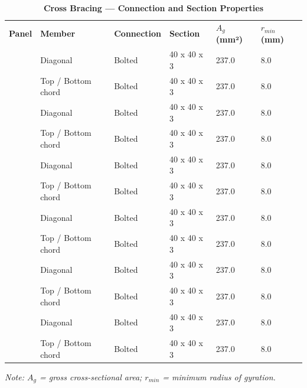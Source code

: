 \documentclass[12pt,a4paper]{report}
\numberwithin{table}{chapter}
\numberwithin{figure}{chapter}
\begin{document}
\vspace{1em}

\vspace{0.4em}
\noindent
\setlength{\tabcolsep}{4pt}
\setlength\LTleft{0pt}
\setlength\LTright{\fill}

\begin{longtable}{|C{2.0cm}|L{2.0cm}|L{2.2cm}|C{2.5cm}|C{2.0cm}|C{2.0cm}|}
\caption{\textbf{Cross Bracing --- Connection and Section Properties}} \\
\hline
\endfirsthead
\hline
\caption{\textbf{Cross Bracing --- Connection and Section Properties}} \\
\hline
\endhead
\textbf{Panel} & \textbf{Member} & \textbf{Connection} & \textbf{Section} & \textbf{$A_g$ (mm²)} & \textbf{$r_{min}$ (mm)} \\[6pt]
\hline
{} & Diagonal & Bolted & 40 x 40 x 3 & 237.0 & 8.0 \\[6pt]
 & Top / Bottom chord & Bolted & 40 x 40 x 3 & 237.0 & 8.0 \\[6pt]
\hline
{} & Diagonal & Bolted & 40 x 40 x 3 & 237.0 & 8.0 \\[6pt]
 & Top / Bottom chord & Bolted & 40 x 40 x 3 & 237.0 & 8.0 \\[6pt]
\hline
{} & Diagonal & Bolted & 40 x 40 x 3 & 237.0 & 8.0 \\[6pt]
 & Top / Bottom chord & Bolted & 40 x 40 x 3 & 237.0 & 8.0 \\[6pt]
\hline
{} & Diagonal & Bolted & 40 x 40 x 3 & 237.0 & 8.0 \\[6pt]
 & Top / Bottom chord & Bolted & 40 x 40 x 3 & 237.0 & 8.0 \\[6pt]
\hline
{} & Diagonal & Bolted & 40 x 40 x 3 & 237.0 & 8.0 \\[6pt]
 & Top / Bottom chord & Bolted & 40 x 40 x 3 & 237.0 & 8.0 \\[6pt]
\hline
{} & Diagonal & Bolted & 40 x 40 x 3 & 237.0 & 8.0 \\[6pt]
 & Top / Bottom chord & Bolted & 40 x 40 x 3 & 237.0 & 8.0 \\[6pt]
\hline
\end{longtable}
\noindent\textit{Note: $A_g$ = gross cross-sectional area; $r_{min}$ = minimum radius of gyration.}
\end{document}
